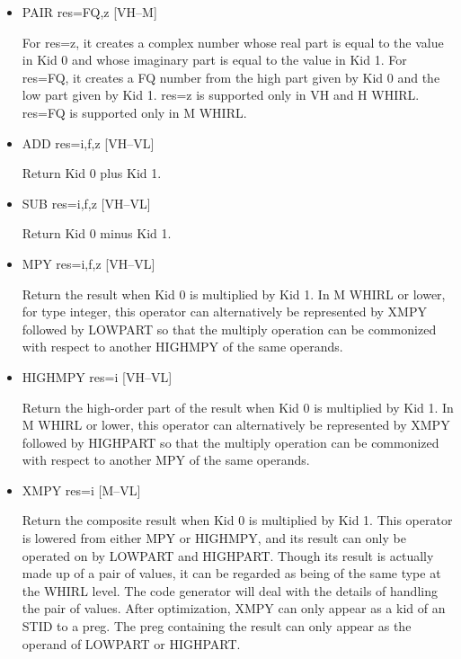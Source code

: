 \documentclass{article}
\begin{document}
\begin{itemize}

%
\item  PAIR res=FQ,z \hfill [VH--M]

For res=z, it creates a complex number whose real part is equal to
the value in Kid 0 and whose imaginary part is equal to the value
in Kid 1. For res=FQ, it creates a FQ number from the high part given by Kid
0 and the low part given by Kid 1. res=z is supported only in VH
and H WHIRL. res=FQ is supported only in M WHIRL. 

\item
{}%
ADD res=i,f,z \hfill [VH--VL]

Return Kid 0 plus Kid 1.


\item
{}%
SUB res=i,f,z \hfill [VH--VL]

Return Kid 0 minus Kid 1.

\item
{}%
MPY res=i,f,z \hfill [VH--VL]

Return the result when Kid 0 is multiplied by Kid 1. In M WHIRL
or lower, for type integer, this operator can alternatively be
represented by
%
XMPY followed by
%
LOWPART so that the multiply operation can be
commonized with respect to another
%
HIGHMPY of the same operands.

\item
{}%
HIGHMPY res=i \hfill [VH--VL]

Return the high-order part of the result when Kid 0 is multiplied
by Kid 1. In M WHIRL or lower, this operator can alternatively be
represented
by
%
XMPY followed by
%
HIGHPART so that the multiply operation can
be commonized with respect to another
%
MPY of the same operands.

\item
{}%
XMPY res=i \hfill [M--VL]

Return the composite result when Kid 0 is multiplied by Kid 1. This
operator is lowered from either
%
MPY or
%
HIGHMPY, and its result can only be operated on by
%
LOWPART
and
%
HIGHPART. Though its result is actually made up of a pair of
values, it can be regarded as being of the same type
at the WHIRL level. The code generator will deal with the details
of handling the pair of values. After optimization,
%
XMPY can only appear as a kid of an
%
STID to a preg. The preg containing
the result can only appear as the operand of
%
LOWPART or
%
HIGHPART.


\end{itemize}
\end{document}
